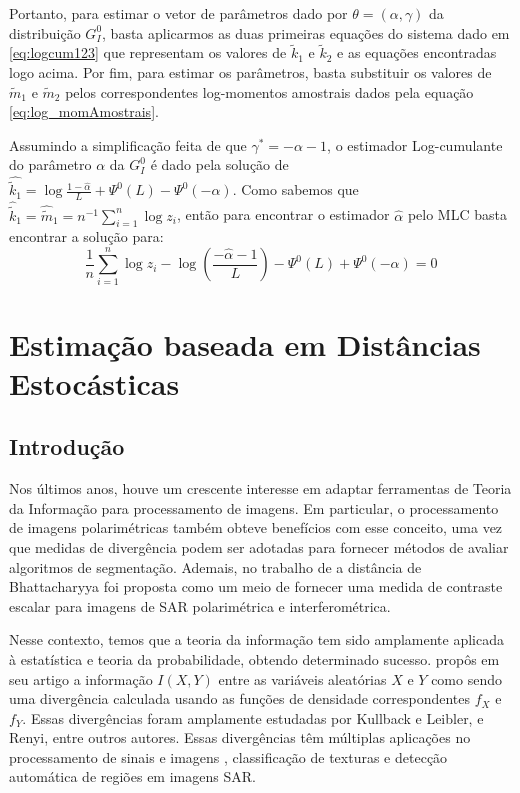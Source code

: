 Portanto, para estimar o vetor de parâmetros dado por $\theta = (\alpha, \gamma)$ da distribuição $G_I^0$, basta aplicarmos as duas primeiras equações do sistema dado em \eqref{eq:logcum123} que representam os valores de $\widetilde{k}_{1}$ e $\widetilde{k}_{2}$ e as equações encontradas logo acima. Por fim, para estimar os parâmetros, basta substituir os valores de $\widetilde{m}_{1}$ e $\widetilde{m}_{2}$ pelos correspondentes log-momentos amostrais dados pela equação \eqref{eq:log_momAmostrais}. 

Assumindo a simplificação feita de que $\gamma^{*} = -\alpha - 1$, o estimador Log-cumulante do parâmetro $\alpha$ da $G_I^0$ é dado pela solução de $\widehat{\widetilde{k}_{1}} = \log \frac{1-\widehat{\alpha}}{L} + \Psi^{0}(L) - \Psi^{0}(-\alpha)$. Como sabemos que $\widehat{\widetilde{k}}_{1} = \widehat{\widetilde{m}}_{1} = n^{-1}\sum_{i=1}^{n}\log z_i$, então para encontrar o estimador $\widehat{\alpha}$ pelo MLC basta encontrar a solução para:
\begin{equation}
    \frac{1}{n}\sum_{i=1}^{n}\log z_i - \log \left ( \frac{-\widehat{\alpha}-1}{L} \right ) - \Psi^{0}(L) + \Psi^{0}(-\alpha) = 0
    \label{eq:alphaEst_logCum}
\end{equation}

\section{Estimação baseada em Distâncias Estocásticas}

\subsection{Introdução}

Nos últimos anos, houve um crescente interesse em adaptar ferramentas de Teoria da Informação para processamento de imagens. 
Em particular, o processamento de imagens polarimétricas também obteve benefícios com esse conceito, uma vez que medidas de divergência podem ser adotadas para fornecer métodos de avaliar algoritmos de segmentação. 
Ademais, no trabalho de \citet{Goudail:04} a distância de Bhattacharyya foi proposta como um meio de fornecer uma medida de contraste escalar para imagens de SAR polarimétrica e interferométrica.

Nesse contexto, temos que a teoria da informação tem sido amplamente aplicada à estatística e teoria da probabilidade, obtendo determinado sucesso. 
\citet{Shannon48} propôs em seu artigo a informação $I(X,Y)$ entre as variáveis aleatórias $X$ e $Y$ como sendo uma divergência calculada usando as funções de densidade correspondentes $f_{X}$ e $f_{Y}$.
Essas divergências foram amplamente estudadas por Kullback e Leibler, e Renyi, entre outros autores. 
Essas divergências têm múltiplas aplicações no processamento de sinais e imagens \citep{Aviyente}, classificação de texturas e detecção automática de regiões em imagens SAR.

